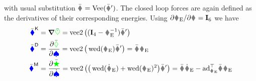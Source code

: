 with usual substitution $\bodyInertiaMatC{}{} = \veeMatOp(\bodyInertiaMatCp{}{})$.
The closed loop forces are again defined as the derivatives of their corresponding energies.
Using $\spdiff[\bodyVelE{}{}]{\bodyVel{}{}} = \idMat[6]$ we have
\begin{subequations}\label{eq:RBCtrlBody}
\begin{align}
 \genForceStiffC
 &= \differential \potentialEnergyC
 = \veeTwoOp \big( (\idMat[4] - \bodyHomoCoordE{}{}^{-1}) \bodyStiffMatCp{}{} \big)
\\
 \genForceDissC
 &= \pdiff[\dissFktC]{\sysVel}
 = \veeTwoOp \big( \wedOp(\bodyVelE{}{}) \bodyDissMatCp{}{} \big)
 = \bodyDissMatC{}{} \bodyVelE{}{}
 \label{eq:RBCtrlBodyDiss}
\\
 \genForceInertiaC
 &= \pdiff[\accEnergyC]{\sysVeld}
 = \veeTwoOp \big( \big(\wedOp(\bodyVelEd{}{}) + \wedOp(\bodyVelE{}{})^2 \big) \bodyInertiaMatCp{}{} \big) 
 = \bodyInertiaMatC{}{} \bodyVelEd{}{} - \ad{\bodyVelE{}{}}^\top \bodyInertiaMatC{}{} \bodyVelE{}{}
\end{align}
\end{subequations}
